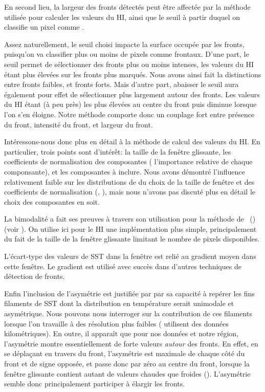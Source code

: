 En second lieu, la largeur des fronts détectés peut être affectée par la méthode utilisée pour calculer les valeurs du HI, ainsi que le seuil à partir duquel on classifie un pixel comme .

Assez naturellement, le seuil choisi impacte la surface occupée par les fronts, puisqu'on va classifier plus ou moins de pixels comme frontaux.
D'une part, le seuil permet de sélectionner des fronts plus ou moins intenses, les valeurs du HI étant plus élevées sur les fronts plus marqués.
Nous avons ainsi fait la distinctions entre fronts faibles, et fronts forts.
Mais d'autre part, abaisser le seuil aura également pour effet de sélectionner plus largement autour des fronts.
Les valeurs du HI étant (à peu près) les plus élevées au centre du front puis diminue lorsque l'on s'en éloigne.
Notre méthode comporte donc un couplage fort entre présence du front, intensité du front, et largeur du front.

Intéressons-nous donc plus en détail à la méthode de calcul des valeurs du HI.
En particulier, trois points sont d'intérết: la taille de la fenêtre glissante, les coefficients de normalisation des composantes ( l'importance relative de chaque componsante), et les composantes à inclure.
Nous avons démontré l'influence relativement faible sur les distributions de  du choix de la taille de fenêtre et des coefficients de normalisation (, ), mais nous n'avons pas discuté plus en détail le choix des composantes en soit.

La bimodalité a fait ses preuves à travers son utilisation pour la méthode de ~() (voir ).
On utilise ici pour le HI une implémentation plus simple, principalement du fait de la taille de la fenêtre glissante limitant le nombre de pixels disponibles.

L'écart-type des valeurs de SST dans la fenêtre est relié au gradient moyen dans cette fenêtre.
Le gradient est utilisé avec succès dans d'autres techniques de détection de fronts.

Enfin l'inclusion de l'asymétrie est justifiée par \textcite{liu_2016} par sa capacité à repérer les fins filaments de SST dont la distribution en température serait unimodale et asymétrique.
Nous pouvons nous interroger sur la contribution de ces filaments lorsque l'on travaille à des résolution plus faibles (\citeauthor{liu_2016} utilisent des données kilométriques).
En outre, il apparaît que pour nos données et notre région, l'asymétrie montre essentiellement de forte valeurs \emph{autour} des fronts.
En effet, en se déplaçant en travers du front, l'asymétrie est maximale de chaque côté du front et de signe opposée, et passe donc par zéro au centre du front, lorsque la fenêtre glissante contient autant de valeurs chaudes que froides ().
L'asymétrie semble donc principalement participer à élargir les fronts.

